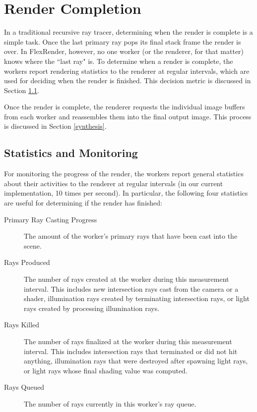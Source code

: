 \documentclass[12pt]{ucthesis}
\begin{document}
\section{Render Completion}
\label{completion}

In a traditional recursive ray tracer, determining when the render is complete
is a simple task. Once the last primary ray pops its final stack frame
the render is over. In FlexRender, however, no one worker (or the renderer, for
that matter) knows where the ``last ray" is. To determine when a render is
complete, the workers report rendering statistics to the renderer at regular
intervals, which are used for deciding when the render is finished. This decision
metric is discussed in Section \ref{stats}.

Once the render is complete, the renderer requests the individual image buffers
from each worker and reassembles them into the final output image. This process
is discussed in Section \ref{synthesis}.

\subsection{Statistics and Monitoring}
\label{stats}

For monitoring the progress of the render, the workers report general statistics
about their activities to the renderer at regular intervals (in our current
implementation, 10 times per second). In particular, the following four
statistics are useful for determining if the render has finished:

\begin{description}
   \item[Primary Ray Casting Progress] The amount of the worker's primary rays
      that have been cast into the scene.
   \item[Rays Produced] The number of rays created at the worker during this
      measurement interval. This includes new intersection rays cast from the
      camera or a shader, illumination rays created by terminating intersection
      rays, or light rays created by processing illumination rays.
   \item[Rays Killed] The number of rays finalized at the worker during this
      measurement interval. This includes intersection rays that terminated or
      did not hit anything, illumination rays that were destroyed after spawning
      light rays, or light rays whose final shading value was computed.
   \item[Rays Queued] The number of rays currently in this worker's ray queue.
\end{description}
\end{document}

